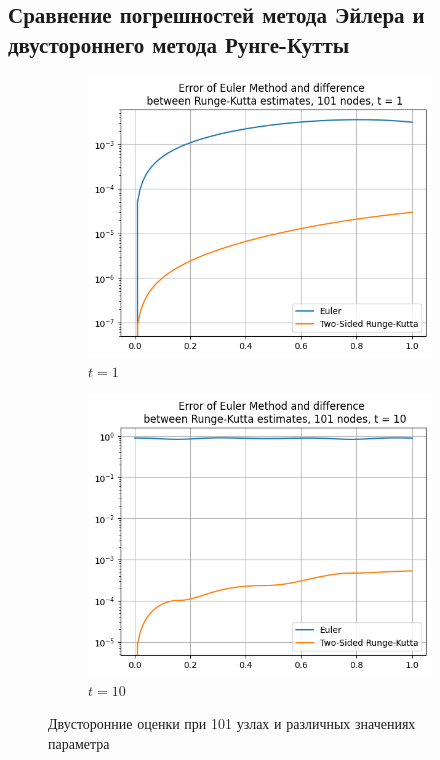 \subsection{Сравнение погрешностей метода Эйлера и двустороннего метода Рунге-Кутты}
\begin{figure}[H]
	\centering
	\begin{subfigure}{0.45\textwidth}
		\centering
		\includegraphics[width=\linewidth]{img/errorEulerAndDifferenceBtwEstimates/ErrEuDifRK11}
		\caption{$t = 1$}
	\end{subfigure}
	\hfill
	\begin{subfigure}{0.45\textwidth}
		\centering
		\includegraphics[width=\linewidth]{img/errorEulerAndDifferenceBtwEstimates/ErrEuDifRK12}
		\caption{$t = 10$}
	\end{subfigure}
	\caption{Двусторонние оценки при 101 узлах и различных значениях параметра}
	\label{fig:two_graphs}
\end{figure}



